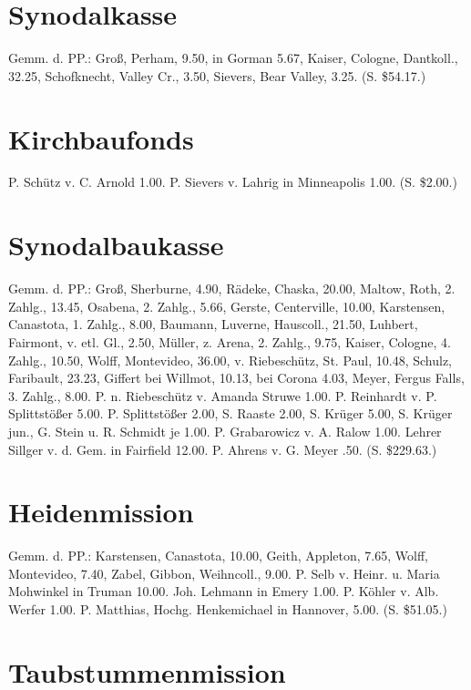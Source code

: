 \section{Synodalkasse}

Gemm. d. PP.: Groß, Perham, 9.50, in Gorman 5.67, Kaiser, Cologne, Dantkoll., 32.25, Schofknecht, Valley Cr., 3.50, Sievers, Bear Valley, 3.25. (S. \$54.17.)

\section{Kirchbaufonds}

P. Schütz v. C. Arnold 1.00. P. Sievers v. Lahrig in Minneapolis 1.00. (S. \$2.00.)

\section{Synodalbaukasse}

Gemm. d. PP.: Groß, Sherburne, 4.90, Rädeke, Chaska, 20.00, Maltow, Roth, 2. Zahlg., 13.45, Osabena, 2. Zahlg., 5.66, Gerste, Centerville, 10.00, Karstensen, Canastota, 1. Zahlg., 8.00, Baumann, Luverne, Hauscoll., 21.50, Luhbert, Fairmont, v. etl. Gl., 2.50, Müller, z. Arena, 2. Zahlg., 9.75, Kaiser, Cologne, 4. Zahlg., 10.50, Wolff, Montevideo, 36.00, v. Riebeschütz, St. Paul, 10.48, Schulz, Faribault, 23.23, Giffert bei Willmot, 10.13, bei Corona 4.03, Meyer, Fergus Falls, 3. Zahlg., 8.00. P. n. Riebeschütz v. Amanda Struwe 1.00. P. Reinhardt v. P. Splittstößer 5.00. P. Splittstößer 2.00, S. Raaste 2.00, S. Krüger 5.00, S. Krüger jun., G. Stein u. R. Schmidt je 1.00. P. Grabarowicz v. A. Ralow 1.00. Lehrer Sillger v. d. Gem. in Fairfield 12.00. P. Ahrens v. G. Meyer .50. (S. \$229.63.)

\section{Heidenmission}

Gemm. d. PP.: Karstensen, Canastota, 10.00, Geith, Appleton, 7.65, Wolff, Montevideo, 7.40, Zabel, Gibbon, Weihncoll., 9.00. P. Selb v. Heinr. u. Maria Mohwinkel in Truman 10.00. Joh. Lehmann in Emery 1.00. P. Köhler v. Alb. Werfer 1.00. P. Matthias, Hochg. Henkemichael in Hannover, 5.00. (S. \$51.05.)

\section{Taubstummenmission}

